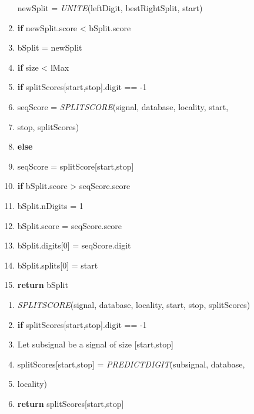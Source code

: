 \documentclass[a4paper,11pt]{article}
\begin{document}
\begin{center}
\begin{enumerate}
newSplit = \textit{UNITE}(leftDigit, bestRightSplit, start)
\item \hspace{3cm}
\textbf{if} newSplit.score < bSplit.score
\item \hspace{4cm}
bSplit = newSplit
\item
\textbf{if} size < lMax
\item \hspace{1cm}
\textbf{if} splitScores[start,stop].digit == -1
\item \hspace{2cm}
seqScore = \textit{SPLITSCORE}(signal, database, locality, start, 
\item \hspace{6.4cm}
stop, splitScores)
\item \hspace{1cm}
\textbf{else}
\item \hspace{2cm}
seqScore = splitScore[start,stop]
\item \hspace{1cm}
\textbf{if} bSplit.score > seqScore.score
\item \hspace{2cm}
bSplit.nDigits = 1
\item \hspace{2cm}
bSplit.score = seqScore.score
\item \hspace{2cm}
bSplit.digits[0] = seqScore.digit
\item \hspace{2cm}
bSplit.splits[0] = start
\item
\textbf{return} bSplit
\end{enumerate}

\vspace{1cm}

\begin{enumerate}
\large
\item[] \textit{SPLITSCORE}(signal, database, locality, start, stop, splitScores)

\item \textbf{if} splitScores[start,stop].digit == -1
\item \hspace{1cm}
Let subsignal be a signal of size [start,stop]
\item \hspace{1cm}
splitScores[start,stop] = \textit{PREDICTDIGIT}(subsignal, database,
\item \hspace{8.1cm}
 locality)
 \item
\textbf{return} splitScores[start,stop]
\end{enumerate}


\end{center}
\end{document}
